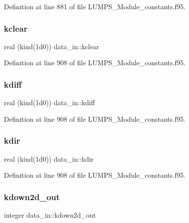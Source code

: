 Definition at line 881 of file L\+U\+M\+P\+S\+\_\+\+Module\+\_\+constants.\+f95.

\mbox{\label{namespacedata__in_ab31fbd3fd9d4036fa930706c4de36397}} 
\subsubsection{\texorpdfstring{kclear}{kclear}}
{\footnotesize\ttfamily real (kind(1d0)) data\+\_\+in\+::kclear}



Definition at line 908 of file L\+U\+M\+P\+S\+\_\+\+Module\+\_\+constants.\+f95.

\mbox{\label{namespacedata__in_ab7baf80fc15ebb7a7b739d064226a548}} 
\subsubsection{\texorpdfstring{kdiff}{kdiff}}
{\footnotesize\ttfamily real (kind(1d0)) data\+\_\+in\+::kdiff}



Definition at line 908 of file L\+U\+M\+P\+S\+\_\+\+Module\+\_\+constants.\+f95.

\mbox{\label{namespacedata__in_a4e6bf95c9d5bb3ea152dc358ac818008}} 
\subsubsection{\texorpdfstring{kdir}{kdir}}
{\footnotesize\ttfamily real (kind(1d0)) data\+\_\+in\+::kdir}



Definition at line 908 of file L\+U\+M\+P\+S\+\_\+\+Module\+\_\+constants.\+f95.

\mbox{\label{namespacedata__in_aca062f5e8ccbe43035af3dd5d7199ac4}} 
\subsubsection{\texorpdfstring{kdown2d\+\_\+out}{kdown2d\_out}}
{\footnotesize\ttfamily integer data\+\_\+in\+::kdown2d\+\_\+out}



